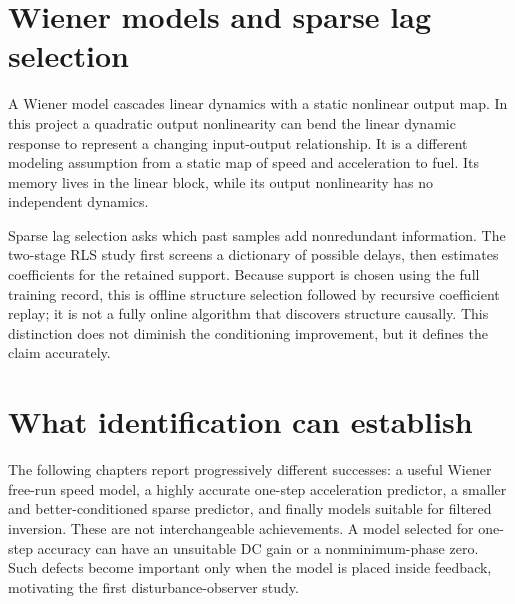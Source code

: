 \section{Wiener models and sparse lag selection}
A Wiener model cascades linear dynamics with a static nonlinear output map. In this project a quadratic output nonlinearity can bend the linear dynamic response to represent a changing input-output relationship. It is a different modeling assumption from a static map of speed and acceleration to fuel. Its memory lives in the linear block, while its output nonlinearity has no independent dynamics.

Sparse lag selection asks which past samples add nonredundant information. The two-stage RLS study first screens a dictionary of possible delays, then estimates coefficients for the retained support. Because support is chosen using the full training record, this is offline structure selection followed by recursive coefficient replay; it is not a fully online algorithm that discovers structure causally. This distinction does not diminish the conditioning improvement, but it defines the claim accurately.

\section{What identification can establish}
The following chapters report progressively different successes: a useful Wiener free-run speed model, a highly accurate one-step acceleration predictor, a smaller and better-conditioned sparse predictor, and finally models suitable for filtered inversion. These are not interchangeable achievements. A model selected for one-step accuracy can have an unsuitable DC gain or a nonminimum-phase zero. Such defects become important only when the model is placed inside feedback, motivating the first disturbance-observer study.
